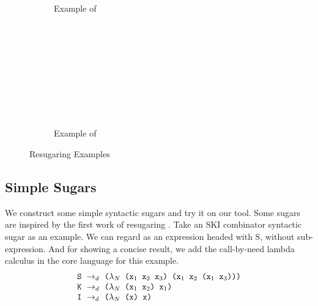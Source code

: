 \begin{figure*}[t]
\begin{subfigure}{.4\linewidth}
	\caption{Example of }
	\label{fig:Map}
\end{subfigure}
\begin{subfigure}{.5\linewidth}
		\begin{flushleft}
			{\scriptsize
			\; \\
			\quad\;\;\;\\
			\\
			\\
			\\
			\\
			\\
			\\

			}
		\end{flushleft}

	\caption{Example of }
	\label{fig:Filter}
\end{subfigure}

\caption{Resugaring Examples}
\label{fig:resugaring}
\end{figure*}


\subsection{Simple Sugars}
\label{mark:simple}

We construct some simple syntactic sugars and try it on our tool. Some sugars are inspired by the first work of resugaring \cite{resugaring}.
Take an SKI combinator syntactic sugar as an example. We can regard  as an expression headed with S, without sub-expression. And for showing a concise result, we add the call-by-need lambda calculus in the core language for this example.
\[
\begin{array}{l}
\mbox{\tt S} ~\rightarrow_d~ \texttt{($\lambda_N$ ($\mbox{\tt x}_1$ $\mbox{\tt x}_2$ $\mbox{\tt x}_3$) ($\mbox{\tt x}_1$ $\mbox{\tt x}_2$ ($\mbox{\tt x}_1$ $\mbox{\tt x}_3$)))}\\
\mbox{\tt K} ~\rightarrow_d~ \texttt{($\lambda_N$ ($\mbox{\tt x}_1$ $\mbox{\tt x}_2$) $\mbox{\tt x}_1$)}\\
\mbox{\tt I} ~\rightarrow_d~ \texttt{($\lambda_N$ (x) x)}
\end{array}
\]




